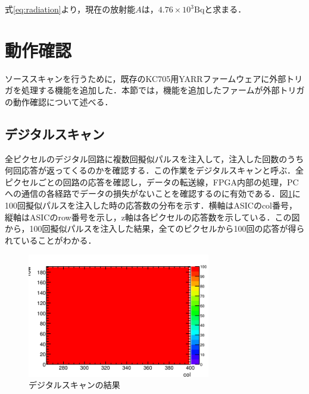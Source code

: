 式\ref{eq:radiation}より，現在の放射能$A$は，$4.76 \times 10^3 \mathrm{Bq}$と求まる．
  

\section{動作確認}
\label{sec:scans}
ソーススキャンを行うために，既存のKC705用YARRファームウェアに外部トリガを処理する機能を追加した．本節では，機能を追加したファームが外部トリガの動作確認について述べる．

%
%
\subsection{デジタルスキャン}
全ピクセルのデジタル回路に複数回擬似パルスを注入して，注入した回数のうち何回応答が返ってくるのかを確認する．この作業をデジタルスキャンと呼ぶ．全ピクセルごとの回路の応答を確認し，データの転送線，FPGA内部の処理，PCへの通信の各経路でデータの損失がないことを確認するのに有効である．図\ref{fig:digital}に100回擬似パルスを注入した時の応答数の分布を示す．横軸はASICのcol番号，縦軸はASICのrow番号を示し，z軸は各ピクセルの応答数を示している．この図から，100回擬似パルスを注入した結果，全てのピクセルから100回の応答が得られていることがわかる．
\begin{figure}[h]
  \centering
  \includegraphics[width=8cm]{./figure/DigitalScan.png}
  \caption{デジタルスキャンの結果}
  \label{fig:digital}
\end{figure}


